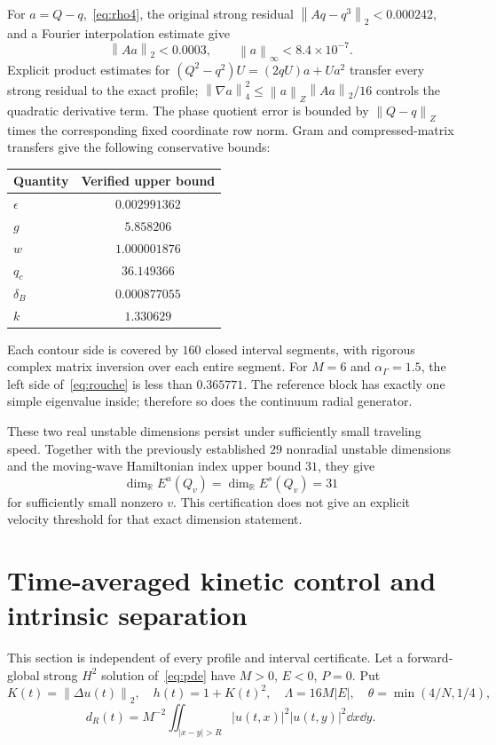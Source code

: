 \documentclass[11pt,a4paper]{article}
\theoremstyle{remark}\newtheorem{remark}[theorem]{Remark}
\newcommand{\R}{\mathbb R}\newcommand{\C}{\mathbb C}
\newcommand{\norm}[1]{\left\|#1\right\|}
\begin{document}
For $a=Q-q$,~\eqref{eq:rho4}, the original strong residual $\norm{Aq-q^3}_2<0.000242$, and a Fourier interpolation estimate give
\[
 \norm{Aa}_2<0.0003,\qquad\norm a_\infty<8.4\times10^{-7}.
\]
Explicit product estimates for $(Q^2-q^2)U=(2qU)a+Ua^2$ transfer every strong residual to the exact profile; $\norm{\nabla a}_4^2\le\norm a_Z\norm{Aa}_2/16$ controls the quadratic derivative term. The phase quotient error is bounded by $\norm{Q-q}_Z$ times the corresponding fixed coordinate row norm. Gram and compressed-matrix transfers give the following conservative bounds:
\begin{center}
\begin{tabular}{@{}lc@{}}\toprule
Quantity & Verified upper bound \\\midrule
$\epsilon$ & $0.002991362$ \\
$g$ & $5.858206$ \\
$w$ & $1.000001876$ \\
$q_c$ & $36.149366$ \\
$\delta_B$ & $0.000877055$ \\
$k$ & $1.330629$ \\\bottomrule
\end{tabular}
\end{center}
Each contour side is covered by $160$ closed interval segments, with rigorous complex matrix inversion over each entire segment. For $M=6$ and $\alpha_\Gamma=1.5$, the left side of~\eqref{eq:rouche} is less than $0.365771$. The reference block has exactly one simple eigenvalue inside; therefore so does the continuum radial generator.

These two real unstable dimensions persist under sufficiently small traveling speed. Together with the previously established $29$ nonradial unstable dimensions and the moving-wave Hamiltonian index upper bound $31$, they give
\[
 \dim_{\R}E^u(Q_v)=\dim_{\R}E^s(Q_v)=31
\]
for sufficiently small nonzero $v$. This certification does not give an explicit velocity threshold for that exact dimension statement.

\section{Time-averaged kinetic control and intrinsic separation}
This section is independent of every profile and interval certificate. Let a forward-global strong $H^2$ solution of~\eqref{eq:pde} have $M>0$, $E<0$, $P=0$. Put
\[
 K(t)=\norm{\Delta u(t)}_2,\quad h(t)=1+K(t)^2,\quad
 \Lambda=16M|E|,\quad\theta=\min(4/N,1/4),
\]
\[
 d_R(t)=M^{-2}\iint_{|x-y|>R}|u(t,x)|^2|u(t,y)|^2\dd x\dd y.
\]
\end{document}
